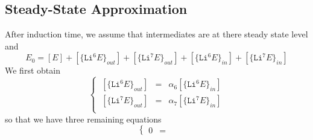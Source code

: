 \documentclass[aps,onecolumn]{revtex4}
\newcommand{\mychem}[1]{\mathtt{#1}}
\begin{document}
\subsection{Steady-State Approximation}
After induction time, we assume that intermediates are at there steady state level
and
\begin{equation}
	E_0 = [E] 
	+ [\lbrace\mychem{Li}^6E\rbrace_{out}]
	+ [\lbrace\mychem{Li}^7E\rbrace_{out}]
	+ [\lbrace\mychem{Li}^6E\rbrace_{in}]
	+ [\lbrace\mychem{Li}^7E\rbrace_{in}]
\end{equation}
We first obtain
\begin{equation}
	\left\lbrace
	\begin{array}{rcl}
	~[\lbrace\mychem{Li}^6E\rbrace_{out}] & = & \alpha_6 [\lbrace\mychem{Li}^6E\rbrace_{in}]\\%
	~[\lbrace\mychem{Li}^7E\rbrace_{out}] & = & \alpha_7 [\lbrace\mychem{Li}^7E\rbrace_{in}]\\
	\end{array}
	\right.
\end{equation}
so that we have three remaining equations
\begin{equation}
	\left\lbrace
	\begin{array}{rcl}
	0 & = & 
	\end{array}
	\right.
\end{equation}
\end{document}
